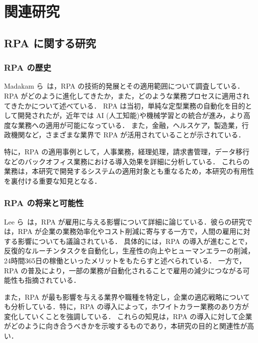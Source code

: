 \chapter{関連研究}
\label{ch:rw}

\quad

\section{RPA に関する研究}
\label{sec:rpa}

\subsection{RPA の歴史}
\label{subsec:rpa_history}

Madakam ら~\cite{Madakam2019}は，RPA の技術的発展とその適用範囲について調査している．RPA がどのように進化してきたか，また，どのような業務プロセスに適用されてきたかについて述べている．
RPA は当初，単純な定型業務の自動化を目的として開発されたが，近年では AI (人工知能)や機械学習との統合が進み，より高度な業務への適用が可能になっている．
また，金融，ヘルスケア，製造業，行政機関など，さまざまな業界で RPA が活用されていることが示されている．

特に，RPA の適用事例として，人事業務，経理処理，請求書管理，データ移行などのバックオフィス業務における導入効果を詳細に分析している．
これらの業務は，本研究で開発するシステムの適用対象とも重なるため，本研究の有用性を裏付ける重要な知見となる．

\subsection{RPA の将来と可能性}
\label{subsec:rpa_future}

Lee ら~\cite{lee2023}は，RPA が雇用に与える影響について詳細に論じている．彼らの研究では，RPA が企業の業務効率化やコスト削減に寄与する一方で，人間の雇用に対する影響についても議論されている．
具体的には，RPA の導入が進むことで，反復的なルーチンタスクを自動化し，生産性の向上やヒューマンエラーの削減，24時間365日の稼働といったメリットをもたらすと述べられている．
一方で，RPA の普及により，一部の業務が自動化されることで雇用の減少につながる可能性も指摘されている．

また，RPA が最も影響を与える業界や職種を特定し，企業の適応戦略についても分析している．特に，RPA の導入によって，ホワイトカラー業務のあり方が変化していくことを強調している．
これらの知見は，RPA の導入に対して企業がどのように向き合うべきかを示唆するものであり，本研究の目的と関連性が高い．

